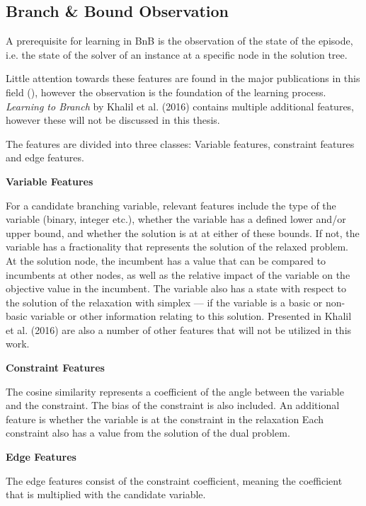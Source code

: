 \subsection{Branch \& Bound Observation}\label{ssec:obs}

A prerequisite for learning in \gls{BnB} is the observation of the state of the episode, i.e. the state of the solver of an instance at a specific node in the solution tree. 

Little attention towards these features are found in the major publications in this field (\cite{gasse2019exact,gupta2020hybrid}), however the observation is the foundation of the learning process.
\textit{Learning to Branch} by Khalil et al. (2016) \cite{khalil2016learning} contains multiple additional features, however these will not be discussed in this thesis. 

The features are divided into three classes: Variable features, constraint features and edge features.


\textbf{Variable Features}

For a candidate branching variable, relevant features include the type of the variable (binary, integer etc.), whether the variable has a defined lower and/or upper bound, and whether the solution is at at either of these bounds.  
If not, the variable has a fractionality that represents the solution of the relaxed problem.
At the solution node, the incumbent has a value that can be compared to incumbents at other nodes, as well as the relative impact of the variable on the objective value in the incumbent. 
The variable also has a state with respect to the solution of the relaxation with simplex --- if the variable is a basic or non-basic variable or other information relating to this solution.
Presented in Khalil et al. (2016) \cite{khalil2016learning} are also a number of other features that will not be utilized in this work.




\textbf{Constraint Features}

The cosine similarity represents a coefficient of the angle between the variable and the constraint.   
The bias of the constraint is also included. 
An additional feature is whether the variable is at the constraint in the relaxation
Each constraint also has a value from the solution of the dual problem. 


\textbf{Edge Features}

The edge features consist of the constraint coefficient, meaning the coefficient that is multiplied with the candidate variable.




